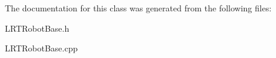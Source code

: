 \-The documentation for this class was generated from the following files\-:\begin{DoxyCompactItemize}
\item 
\-L\-R\-T\-Robot\-Base.\-h\item 
\-L\-R\-T\-Robot\-Base.\-cpp\end{DoxyCompactItemize}
